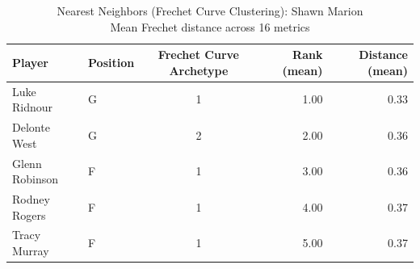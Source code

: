 \begin{table}[t]
\caption*{
{\fontsize{20}{25} Nearest Neighbors (Frechet Curve Clustering): Shawn Marion\fontsize{12}{15}\selectfont } \\ 
{\fontsize{14}{17}\selectfont  Mean Frechet distance across 16 metrics\fontsize{12}{15}\selectfont }
} 
\fontsize{12.0pt}{14.0pt}\selectfont
\begin{tabular*}{\linewidth}{@{\extracolsep{\fill}}llcrr}
\toprule
Player & Position & Frechet Curve Archetype & Rank (mean) & Distance (mean) \\ 
\midrule\addlinespace[2.5pt]
Luke Ridnour & G & 1 & 1.00 & 0.33 \\ 
Delonte West & G & 2 & 2.00 & 0.36 \\ 
Glenn Robinson & F & 1 & 3.00 & 0.36 \\ 
Rodney Rogers & F & 1 & 4.00 & 0.37 \\ 
Tracy Murray & F & 1 & 5.00 & 0.37 \\ 
\bottomrule
\end{tabular*}
\end{table}

